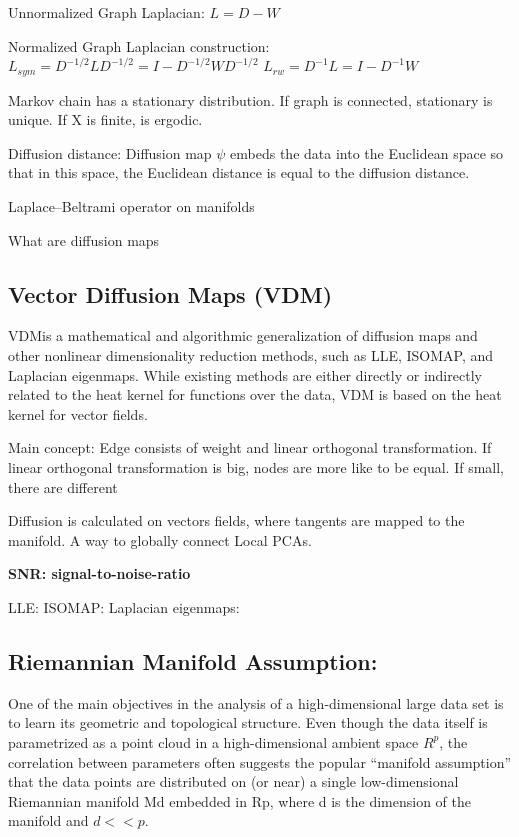 Unnormalized Graph Laplacian:
$L = D - W$

Normalized Graph Laplacian construction:
$L_{sym} = D^{-1/2}LD^{-1/2} = I - D^{-1/2}WD^{-1/2} $
$L_{rw} = D^{-1}L = I - D^{-1}W $

Markov chain has a stationary distribution.
If graph is connected, stationary is unique.
If X is finite,  is ergodic.

Diffusion distance:
Diffusion map $\psi$ embeds the data into the Euclidean space so that in this space, the Euclidean
distance is equal to the diffusion distance.

Laplace–Beltrami operator on manifolds

What are diffusion maps

\subsection{Vector Diffusion Maps (VDM)}

\cite{vectorDiffusionMaps}
VDMis a mathematical and algorithmic generalization of diffusion maps
and other nonlinear dimensionality reduction methods, such as LLE, ISOMAP,
and Laplacian eigenmaps. While existing methods are either directly or indirectly
related to the heat kernel for functions over the data, VDM is based on
the heat kernel for vector fields.

Main concept:
Edge consists of weight and linear orthogonal transformation.
If linear orthogonal transformation is big, nodes are more like to be equal.
If small, there are different

Diffusion is calculated on vectors fields, where tangents are mapped to the manifold.
A way to globally connect Local PCAs.

\textbf{SNR: signal-to-noise-ratio}


LLE:
ISOMAP:
Laplacian eigenmaps:


\subsection{Riemannian Manifold Assumption:}
One of the main objectives in the analysis of a high-dimensional large data set
is to learn its geometric and topological structure. Even though the data itself is
parametrized as a point cloud in a high-dimensional ambient space $R^p$, the correlation
between parameters often suggests the popular “manifold assumption” that
the data points are distributed on (or near) a single low-dimensional Riemannian
manifold Md embedded in Rp, where d is the dimension of the manifold and
$d << p$.


